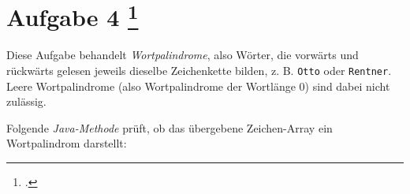 \documentclass{lehramt-informatik-aufgabe}
\begin{document}
\let\c=\liKontrollCode

\section{Aufgabe 4
\footcite{66116:2020:09}}

Diese Aufgabe behandelt \emph{Wortpalindrome}, also Wörter, die vorwärts
und rückwärts gelesen jeweils dieselbe Zeichenkette bilden, z. B.
\texttt{Otto} oder \texttt{Rentner}. Leere Wortpalindrome (also
Wortpalindrome der Wortlänge 0) sind dabei nicht zulässig.

Folgende \emph{Java-Methode} prüft, ob das übergebene Zeichen-Array ein
Wortpalindrom darstellt:

\end{document}
